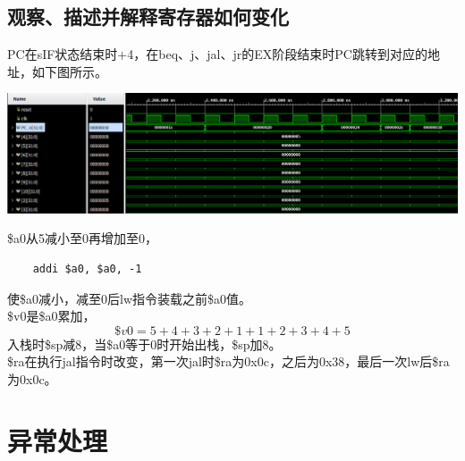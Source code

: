\documentclass{article}
\begin{document}
\subsection{观察、描述并解释寄存器如何变化}
PC在sIF状态结束时+4，在beq、j、jal、jr的EX阶段结束时PC跳转到对应的地址，如下图所示。
\begin{center}
    \includegraphics[width = 16cm]{images/pc_waveform.png}
\end{center}
\$a0从5减小至0再增加至0，
\begin{lstlisting}
    addi $a0, $a0, -1
\end{lstlisting}
使\$a0减小，减至0后lw指令装载之前\$a0值。\\
\$v0是\$a0累加，
\[\$v0 = 5+4+3+2+1+1+2+3+4+5\]
入栈时\$sp减8，当\$a0等于0时开始出栈，\$sp加8。\\
\$ra在执行jal指令时改变，第一次jal时\$ra为0x0c，之后为0x38，最后一次lw后\$ra为0x0c。

\section{异常处理}

\end{document}

